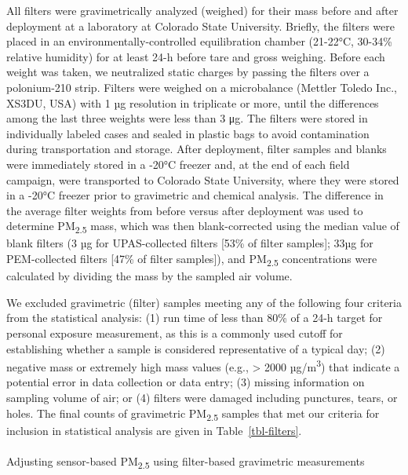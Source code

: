 \documentclass[
  letterpaper,
  DIV=11,
  numbers=noendperiod]{scrartcl}
\makeatletter
\let\oldparagraph\paragraph
\renewcommand{\paragraph}{
    \@ifstar
      \xxxParagraphStar
      \xxxParagraphNoStar
  }
\newcommand{\xxxParagraphStar}[1]{\oldparagraph*{#1}\mbox{}}
\newcommand{\xxxParagraphNoStar}[1]{\oldparagraph{#1}\mbox{}}
\makeatother
\begin{document}
All filters were gravimetrically analyzed (weighed) for their mass
before and after deployment at a laboratory at Colorado State
University. Briefly, the filters were placed in an
environmentally-controlled equilibration chamber (21-22°C, 30-34\%
relative humidity) for at least 24-h before tare and gross weighing.
Before each weight was taken, we neutralized static charges by passing
the filters over a polonium-210 strip. Filters were weighed on a
microbalance (Mettler Toledo Inc., XS3DU, USA) with 1 µg resolution in
triplicate or more, until the differences among the last three weights
were less than 3 μg. The filters were stored in individually labeled
cases and sealed in plastic bags to avoid contamination during
transportation and storage. After deployment, filter samples and blanks
were immediately stored in a -20°C freezer and, at the end of each field
campaign, were transported to Colorado State University, where they were
stored in a -20°C freezer prior to gravimetric and chemical analysis.
The difference in the average filter weights from before versus after
deployment was used to determine PM\textsubscript{2.5} mass, which was
then blank-corrected using the median value of blank filters (3 µg for
UPAS-collected filters {[}53\% of filter samples{]}; 33µg for
PEM-collected filters {[}47\% of filter samples{]}), and
PM\textsubscript{2.5} concentrations were calculated by dividing the
mass by the sampled air volume.

We  excluded gravimetric (filter) samples meeting any of
the following four criteria from the statistical analysis: (1) run time
of less than 80\% of a 24-h target for personal exposure measurement, as
this is a commonly used cutoff for establishing whether a sample is
considered representative of a typical day; (2) negative mass or
extremely high mass values (e.g., \textgreater{} 2000
µg/m\textsuperscript{3}) that indicate a potential error in data
collection or data entry; (3) missing information on sampling volume of
air; or (4) filters were damaged including punctures, tears, or holes.
The final counts of gravimetric PM\textsubscript{2.5} samples that met
our criteria for inclusion in statistical analysis are given in
Table~\ref{tbl-filters}.

\paragraph{\texorpdfstring{Adjusting sensor-based PM\textsubscript{2.5}
using filter-based gravimetric
measurements}{Adjusting sensor-based PM2.5 using filter-based gravimetric measurements}}\label{adjusting-sensor-based-pm2.5-using-filter-based-gravimetric-measurements}
\end{document}
